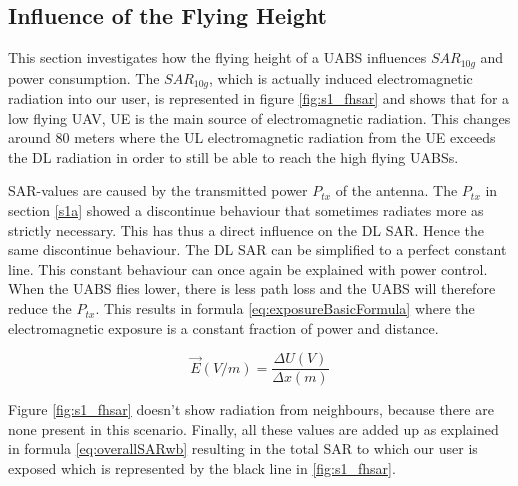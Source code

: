 \FloatBarrier
\subsection{Influence of the Flying Height}
\label{sub:senario1_influenceOfFlyHeight}

This section investigates how the flying height of a \gls{UABS} influences $SAR_{10g}$ and power consumption.
The $SAR_{10g}$, which is actually induced electromagnetic radiation into our user, is represented in figure \ref{fig:s1_fhsar}
and shows that for a low flying \gls{UAV}, \gls{UE} is the main source of electromagnetic radiation.
This changes around 80 meters where the \gls{UL} electromagnetic radiation from the \gls{UE}
exceeds the \gls{DL} radiation in order to still be able to reach the high flying \gls{UABS}s.

\gls{SAR}-values are caused by the transmitted power  $P_{tx}$ of the antenna. The $P_{tx}$ in section \ref{s1a}
showed a discontinue behaviour that sometimes radiates more as strictly necessary. This has thus a direct influence
on the \gls{DL} \gls{SAR}. Hence the same discontinue behaviour. The \gls{DL} \gls{SAR} can be simplified to a perfect constant line.
This constant behaviour can once again be explained with power control. When the \gls{UABS} flies lower, there is less path loss and the \gls{UABS} 
will therefore reduce the $P_{tx}$. This results in formula \ref{eq:exposureBasicFormula} where the electromagnetic exposure is a constant fraction of power and distance.

\begin{equation}
\vec{E} (V/m) = \frac{\Delta U (V) }{\Delta x (m)}
\label{eq:exposureBasicFormula}
\end{equation}


Figure \ref{fig:s1_fhsar} doesn't show radiation from neighbours, because there are none present in this scenario. 
Finally, all these values are added up as explained in formula \ref{eq:overallSARwb} resulting in the total \gls{SAR}
to which our user is exposed which is represented by the black line in \ref{fig:s1_fhsar}.

